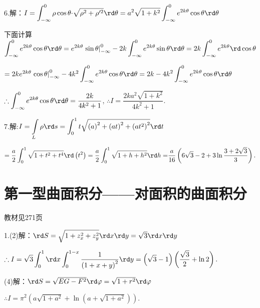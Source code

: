   6.解：$I = \displaystyle\int_{ - \infty }^0 {\rho \cos \theta  \cdot } \sqrt {{\rho ^2} + \rho {'^2}} \rd \theta  = {a^2}\sqrt {1 + {k^2}} \displaystyle\int_{ - \infty }^0 {{e^{2k\theta }}\cos \theta \rd \theta } $

  下面计算$\displaystyle\int_{-\infty }^0 {{e^{2k\theta }}} \cos \theta \rd \theta  = {e^{2k\theta }}\left. {\sin \theta } \right|_{ - \infty }^0 - 2k\displaystyle\int_{ - \infty }^0 {{e^{2k\theta }}\sin \theta \rd \theta  = 2k\displaystyle\int_{ - \infty }^0 {{e^{2k\theta }}\rd \cos \theta } } $

  $= 2k{e^{2k\theta }}\left. {\cos \theta } \right|_{ - \infty }^0 - 4{k^2}\displaystyle\int_{ - \infty }^0 {{e^{2k\theta }}} \cos \theta \rd \theta  = 2k - 4{k^2}\displaystyle\int_{ - \infty }^0 {{e^{2k\theta }}} \cos \theta \rd \theta $

  $\therefore \displaystyle\int_{ - \infty }^0 {{e^{2k\theta }}} \cos \theta \rd \theta  = \dfrac{{2k}}{{4{k^2} + 1}}$, $\therefore I = \displaystyle\dfrac{{2k{a^2}\sqrt {1 + {k^2}} }}{{4{k^2} + 1}}.$

  7.解:$I = \displaystyle\int\limits_L {\rho \rd s = \displaystyle\int_0^1 {t\sqrt {{{\left( a \right)}^2} + {{\left( {at} \right)}^2} + {{\left( {a{t^2}} \right)}^2}} } } \rd t$

  $= \displaystyle\dfrac{a}{2} \displaystyle\int_0^1 {\sqrt {1 + {t^2} + {t^4}} } \rd \left( {{t^2}} \right) = \dfrac{a}{2}\displaystyle\int_0^1 {\sqrt {1 + h + {h^2}} \rd h = } \dfrac{a}{{16}}\left( {6\sqrt 3  - 2 + 3\ln \dfrac{{3 + 2\sqrt 3 }}{3}} \right).$

\section{第一型曲面积分——对面积的曲面积分}
\begin{flushright}
  \color{zhanqing!80}
   教材见271页
\end{flushright}

  1.(2)解：$\rd S = \sqrt {1 + z_x^2 + z_y^2} \rd x\rd y = \sqrt 3 \rd x\rd y$

  $\therefore I = \displaystyle\sqrt 3 \displaystyle\int_0^1 {\rd x\displaystyle\int_0^{1 - x} {\dfrac{1}{{{{\left( {1 + x + y} \right)}^2}}}\rd y = \left( {\sqrt 3  - 1} \right)\left( {\dfrac{{\sqrt 3 }}{2} + \ln 2} \right).} }$

  (4)解：$\rd S = \sqrt {EG - {F^2}} \rd\varphi  = \sqrt {1 + {r^2}} \rd\varphi $

  $\therefore I = {\pi ^2}\left( {a\sqrt {1 + {a^2}}  + \ln \left( {a + \sqrt {1 + {a^2}} } \right)} \right).$


